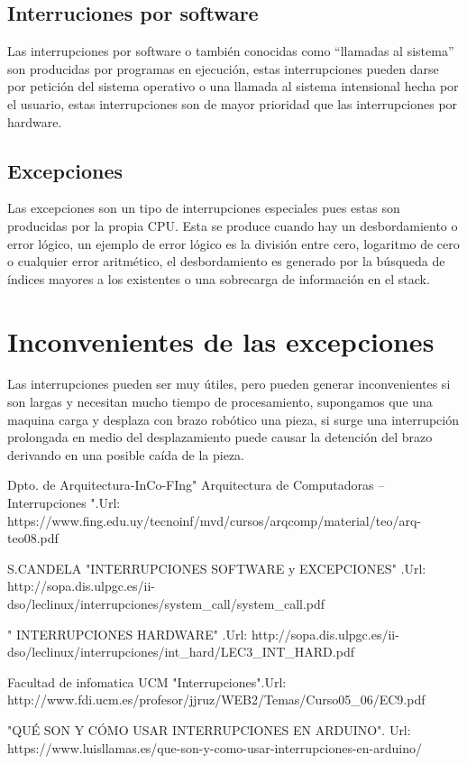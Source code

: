 \documentclass[letterpaper, 12pt]{article}
\begin{document}
\subsection{Interruciones por software}
Las interrupciones por software o también conocidas como “llamadas al sistema” son producidas por programas en ejecución, estas interrupciones pueden darse por petición del sistema operativo o una llamada al sistema intensional hecha por el usuario, estas interrupciones son de mayor prioridad que las interrupciones por hardware.
\subsection{Excepciones}
Las excepciones son un tipo de interrupciones especiales pues estas son producidas por la propia CPU. Esta se produce cuando hay un desbordamiento o error lógico, un ejemplo de error lógico es la división entre cero, logaritmo de cero o cualquier error aritmético, el desbordamiento es generado por la búsqueda de índices mayores a los existentes o una sobrecarga de información en el stack.
\section{Inconvenientes de las excepciones}
Las interrupciones pueden ser muy útiles, pero pueden generar inconvenientes si son largas y necesitan mucho tiempo de procesamiento, supongamos que una maquina carga y desplaza con brazo robótico una pieza, si surge una interrupción prolongada en medio del desplazamiento puede causar la detención del brazo derivando en una posible caída de la pieza.

\begin{thebibliography}{0}

 Dpto. de Arquitectura-InCo-FIng" Arquitectura de Computadoras – Interrupciones ".Url: https://www.fing.edu.uy/tecnoinf/mvd/cursos/arqcomp/material/teo/arq-teo08.pdf

 S.CANDELA "INTERRUPCIONES
SOFTWARE y EXCEPCIONES" .Url: http://sopa.dis.ulpgc.es/ii-dso/leclinux/interrupciones/system_call/system_call.pdf

" INTERRUPCIONES HARDWARE" .Url: http://sopa.dis.ulpgc.es/ii-dso/leclinux/interrupciones/int_hard/LEC3_INT_HARD.pdf

Facultad de infomatica UCM "Interrupciones".Url: http://www.fdi.ucm.es/profesor/jjruz/WEB2/Temas/Curso05_06/EC9.pdf

"QUÉ SON Y CÓMO USAR INTERRUPCIONES EN ARDUINO". Url: https://www.luisllamas.es/que-son-y-como-usar-interrupciones-en-arduino/

\end{thebibliography}
\end{document}
